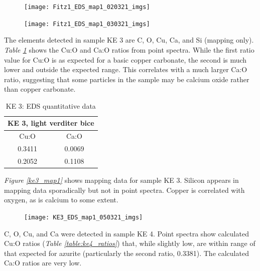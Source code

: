 \begin{figure}[H]
\centering
  \texttt{[image: Fitz1\_EDS\_map1\_020321\_imgs]}
\label{fig:fitz1_map1}
\end{figure}

\begin{figure}[H]
\centering
  \texttt{[image: Fitz1\_EDS\_map1\_030321\_imgs]}
\label{fig:fitz1_map2}
\end{figure}


The elements detected in sample KE 3 are C, O, Cu, Ca, and Si (mapping only). \textit{Table \ref{table:ke3_ratios}} shows the Cu:O and Ca:O ratios from point spectra. While the first ratio value for Cu:O is as expected for a basic copper carbonate, the second is much lower and outside the expected range. This correlates with a much larger Ca:O ratio, suggesting that some particles in the sample may be calcium oxide rather than copper carbonate.

\begin{table}[H]
\caption{KE 3: EDS quantitative data}
\centering
\label{table:ke3_ratios}
\begin{tabular}{c c}
\toprule
\multicolumn{2}{c}{KE 3, light verditer bice} \\
\midrule
Cu:O & Ca:O \\
\midrule
0.3411 & 0.0069 \\
0.2052 & 0.1108 \\
\bottomrule
\end{tabular}
\end{table}

\textit{Figure \ref{ke3_map1}} shows mapping data for sample KE 3. Silicon appears in mapping data sporadically but not in point spectra. Copper is correlated with oxygen, as is calcium to some extent.

\begin{figure}[H]
\centering
  \texttt{[image: KE3\_EDS\_map1\_050321\_imgs]}
\label{fig:ke3_map1}
\end{figure}


C, O, Cu, and Ca were detected in sample KE 4. Point spectra show calculated Cu:O ratios (\textit{Table \ref{table:ke4_ratios}}) that, while slightly low, are within range of that expected for azurite (particularly the second ratio, 0.3381). The calculated Ca:O ratios are very low.

